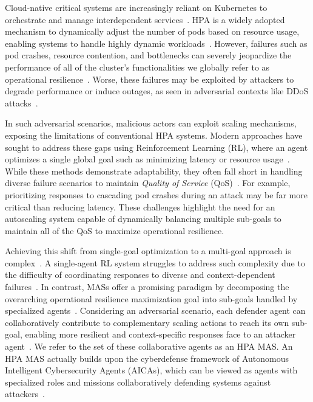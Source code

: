 Cloud-native critical systems are increasingly reliant on Kubernetes to orchestrate and manage interdependent services~\cite{Pahl2019}. HPA is a widely adopted mechanism to dynamically adjust the number of pods based on resource usage, enabling systems to handle highly dynamic workloads~\cite{Toka2020}. However, failures such as pod crashes, resource contention, and bottlenecks can severely jeopardize the performance of all of the cluster's functionalities we globally refer to as operational resilience~\cite{burns2016borg}. Worse, these failures may be exploited by attackers to degrade performance or induce outages, as seen in adversarial contexts like DDoS attacks~\cite{David2021}.

In such adversarial scenarios, malicious actors can exploit scaling mechanisms, exposing the limitations of conventional HPA systems. Modern approaches have sought to address these gaps using Reinforcement Learning (RL), where an agent optimizes a single global goal such as minimizing latency or resource usage~\cite{Gari2021}. While these methods demonstrate adaptability, they often fall short in handling diverse failure scenarios to maintain \textit{Quality of Service} (QoS)~\cite{Liu2024}. For example, prioritizing responses to cascading pod crashes during an attack may be far more critical than reducing latency. These challenges highlight the need for an autoscaling system capable of dynamically balancing multiple sub-goals to maintain all of the QoS to maximize operational resilience.

Achieving this shift from single-goal optimization to a multi-goal approach is complex~\cite{Shoham2009MAS}. A single-agent RL system struggles to address such complexity due to the difficulty of coordinating responses to diverse and context-dependent failures~\cite{Jennings1998}. In contrast, MASs offer a promising paradigm by decomposing the overarching operational resilience maximization goal into sub-goals handled by specialized agents~\cite{Shoham2009MAS}. Considering an adversarial scenario, each defender agent can collaboratively contribute to complementary scaling actions to reach its own sub-goal, enabling more resilient and context-specific responses face to an attacker agent~\cite{Jennings1998}. We refer to the set of these collaborative agents as an HPA MAS. An HPA MAS actually builds upon the cyberdefense framework of Autonomous Intelligent Cybersecurity Agents (AICAs), which can be viewed as agents with specialized roles and missions collaboratively defending systems against attackers~\cite{Kott2018}.

